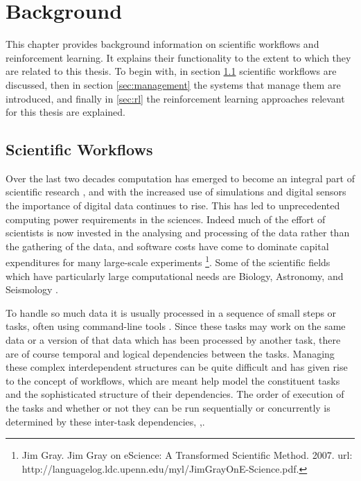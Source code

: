 
\cleardoublepage
\chapter{Background}
\label{cha:background}


This chapter provides background information on scientific workflows and reinforcement learning. It explains their functionality to the extent to which they are related to this thesis. To begin with, in section \ref{sec:workflows} scientific workflows are discussed, then in section \ref{sec:management} the systems that manage them are introduced, and finally in \ref{sec:rl} the reinforcement learning approaches relevant for this thesis are explained. 


\section{Scientific Workflows}
\label{sec:workflows}

Over the last two decades computation has emerged to become an integral part of scientific research \cite{deelman},\cite{parallelization} and with the increased use of simulations and digital sensors the importance of digital data continues to rise\cite{ScientificWorkflows}. This has led to unprecedented computing power requirements in the sciences. Indeed much of the effort of scientists is now invested in the analysing and processing of the data rather than the gathering of the data, and software costs have come to dominate capital expenditures for many large-scale experiments \footnote{Jim Gray. Jim Gray on eScience: A Transformed Scientific Method. 2007. url: http://languagelog.ldc.upenn.edu/myl/JimGrayOnE-Science.pdf.}. Some of the scientific fields which have particularly large computational needs are Biology, Astronomy, and Seismology \cite{ScientificWorkflows}. 

To handle so much data it is usually processed in a sequence of small steps or tasks, often using command-line tools \cite{FeedbackBasedAllocation}. Since these tasks may work on the same data or a version of that data which has been processed by another task, there are of course temporal and logical dependencies between the tasks. Managing these complex interdependent structures can be quite difficult and has given rise to the concept of workflows, which are meant help model the constituent tasks and the sophisticated structure of their dependencies. The order of execution of the tasks and whether or not they can be run sequentially or concurrently is determined by these inter-task dependencies, \cite{parallelization},\cite{examining}.

